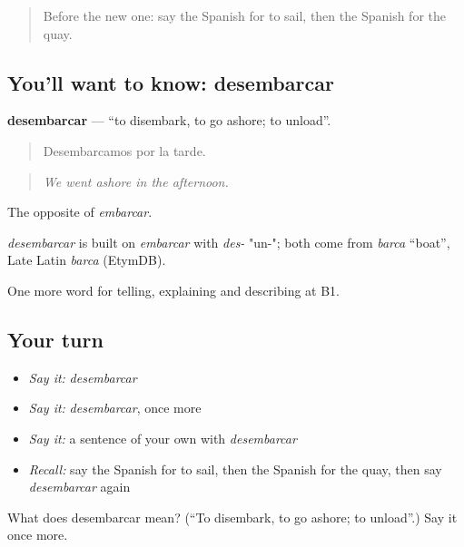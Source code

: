\label{lesson:ES-C658-desembarcar}



\begin{quote}
Before the new one: say the Spanish for to sail, then the Spanish for the quay.
\end{quote}

\subsection*{You'll want to know: desembarcar}
\textbf{desembarcar} — \textquotedblleft{}to disembark, to go ashore; to unload\textquotedblright{}.

\begin{quote}
Desembarcamos por la tarde.
\end{quote}

\begin{quote}
\emph{We went ashore in the afternoon.}
\end{quote}

The opposite of \emph{embarcar}.

\begin{cousinweb}
\emph{desembarcar} is built on \emph{embarcar} with \emph{des-} "un-"; both come from \emph{barca} \textquotedblleft{}boat\textquotedblright{}, Late Latin \emph{barca} (EtymDB).
\end{cousinweb}

\begin{grammarlens}[title={What you've built}]
One more word for telling, explaining and describing at B1.
\end{grammarlens}

\subsection*{Your turn}
\begin{itemize}
\raggedright
  \item \emph{Say it:} \emph{desembarcar}
  \item \emph{Say it:} \emph{desembarcar}, once more
  \item \emph{Say it:} a sentence of your own with \emph{desembarcar}
  \item \emph{Recall:} say the Spanish for to sail, then the Spanish for the quay, then say \emph{desembarcar} again
\end{itemize}

\begin{tcolorbox}[breakable,colback=teal!4,colframe=teal!35!black,title={Before you move on}]
What does desembarcar mean? (\textquotedblleft{}To disembark, to go ashore; to unload\textquotedblright{}.) Say it once more.
\end{tcolorbox}

